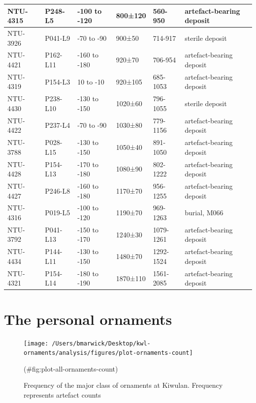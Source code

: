 \documentclass[]{article}
\begin{document}
\begin{table}
\begin{tabular}[t]{l|l|l|l|l|l}
\hline
NTU-4315 & P248-L5 & -100 to -120 & 800±120 & 560-950 & artefact-bearing deposit\\
\hline
NTU-3926 & P041-L9 & -70 to -90 & 900±50 & 714-917 & sterile deposit\\
\hline
NTU-4421 & P162-L11 & -160 to -180 & 920±70 & 706-954 & artefact-bearing deposit\\
\hline
NTU-4319 & P154-L3 & 10 to -10 & 920±105 & 685-1053 & artefact-bearing deposit\\
\hline
NTU-4430 & P238-L10 & -130 to -150 & 1020±60 & 796-1055 & sterile deposit\\
\hline
NTU-4422 & P237-L4 & -70 to -90 & 1030±80 & 779-1156 & artefact-bearing deposit\\
\hline
NTU-3788 & P028-L15 & -130 to -150 & 1050±40 & 891-1050 & artefact-bearing deposit\\
\hline
NTU-4428 & P154-L13 & -170 to -180 & 1080±90 & 802-1222 & artefact-bearing deposit\\
\hline
NTU-4427 & P246-L8 & -160 to -180 & 1170±70 & 956-1255 & artefact-bearing deposit\\
\hline
NTU-4316 & P019-L5 & -100 to -120 & 1190±70 & 969-1263 & burial, M066\\
\hline
NTU-3792 & P041-L13 & -150 to -170 & 1240±30 & 1079-1261 & artefact-bearing deposit\\
\hline
NTU-4434 & P144-L11 & -130 to -150 & 1480±70 & 1292-1524 & artefact-bearing deposit\\
\hline
NTU-4321 & P154-L14 & -180 to -190 & 1870±110 & 1561-2085 & artefact-bearing deposit\\
\hline
\end{tabular}
\end{table}

\hypertarget{the-personal-ornaments}{%
\section{The personal ornaments}\label{the-personal-ornaments}}

\begin{figure}
\texttt{[image: /Users/bmarwick/Desktop/kwl-ornaments/analysis/figures/plot-ornaments-count]} \caption{Frequency of the major class of ornaments at Kiwulan. Frequency represents artefact counts}(\#fig:plot-all-ornaments-count)
\end{figure}
\end{document}
